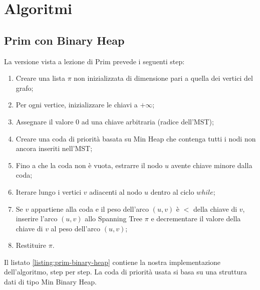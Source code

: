 
\section{Algoritmi}
\label{cap:algorithms}

\subsection{Prim con Binary Heap}

La versione vista a lezione di Prim prevede i seguenti step:

\begin{enumerate}
    \item Creare una lista $\pi$ non inizializzata di dimensione pari a quella dei vertici del grafo;
    \item Per ogni vertice, inizializzare le chiavi a $+\infty$;
    \item Assegnare il valore $0$ ad una chiave arbitraria (radice dell'MST);
    \item Creare una coda di priorità basata su Min Heap che contenga tutti i nodi non ancora inseriti nell'MST;
    \item Fino a che la coda non è vuota, estrarre il nodo $u$ avente chiave minore dalla coda;
    \item Iterare lungo i vertici $v$ adiacenti al nodo $u$ dentro al ciclo $while$;
    \item Se $v$ appartiene alla coda e il peso dell'arco $(u, v)$ è $<$ della chiave di $v$, inserire l'arco $(u, v)$ allo Spanning Tree $\pi$ e decrementare il valore della chiave di $v$ al peso dell'arco $(u, v)$;
    \item Restituire $\pi$.
\end{enumerate}

\noindent Il listato \ref{listing:prim-binary-heap} contiene la nostra implementazione dell'algoritmo, step per step. La coda di priorità usata si basa su una struttura dati di tipo Min Binary Heap. \\

